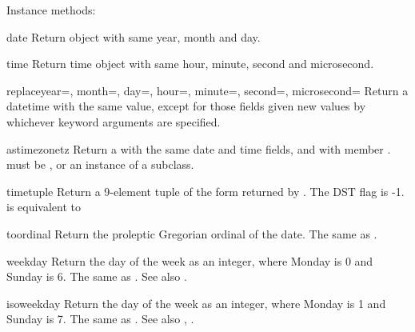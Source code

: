 Instance methods:

\begin{methoddesc}{date}{}
  Return  object with same year, month and day.
\end{methoddesc}

\begin{methoddesc}{time}{}
  Return time object with same hour, minute, second and microsecond.
\end{methoddesc}

\begin{methoddesc}{replace}{year=, month=, day=, hour=, minute=,
                            second=, microsecond=}
  Return a datetime with the same value, except for those fields given
  new values by whichever keyword arguments are specified.
\end{methoddesc}

\begin{methoddesc}{astimezone}{tz}
  Return a  with the same date and time fields, and
  with  member .   must be ,
  or an instance of a  subclass.
\end{methoddesc}

\begin{methoddesc}{timetuple}{}
  Return a 9-element tuple of the form returned by
  .
  The DST flag is -1.    is equivalent to
\end{methoddesc}

\begin{methoddesc}{toordinal}{}
  Return the proleptic Gregorian ordinal of the date.  The same as
  .
\end{methoddesc}

\begin{methoddesc}{weekday}{}
  Return the day of the week as an integer, where Monday is 0 and
  Sunday is 6.  The same as .
  See also .
\end{methoddesc}

\begin{methoddesc}{isoweekday}{}
  Return the day of the week as an integer, where Monday is 1 and
  Sunday is 7.  The same as .
  See also , .
\end{methoddesc}

